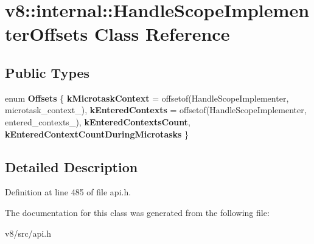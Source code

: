 \hypertarget{classv8_1_1internal_1_1HandleScopeImplementerOffsets}{}\section{v8\+:\+:internal\+:\+:Handle\+Scope\+Implementer\+Offsets Class Reference}
\label{classv8_1_1internal_1_1HandleScopeImplementerOffsets}
\subsection*{Public Types}
\begin{DoxyCompactItemize}
\item 
\mbox{\label{classv8_1_1internal_1_1HandleScopeImplementerOffsets_adfa03da7487599807001a78ccf7d0975}} 
enum {\bfseries Offsets} \{ {\bfseries k\+Microtask\+Context} = offsetof(Handle\+Scope\+Implementer, microtask\+\_\+context\+\_\+), 
{\bfseries k\+Entered\+Contexts} = offsetof(Handle\+Scope\+Implementer, entered\+\_\+contexts\+\_\+), 
{\bfseries k\+Entered\+Contexts\+Count}, 
{\bfseries k\+Entered\+Context\+Count\+During\+Microtasks}
 \}
\end{DoxyCompactItemize}


\subsection{Detailed Description}


Definition at line 485 of file api.\+h.



The documentation for this class was generated from the following file\+:\begin{DoxyCompactItemize}
\item 
v8/src/api.\+h\end{DoxyCompactItemize}
